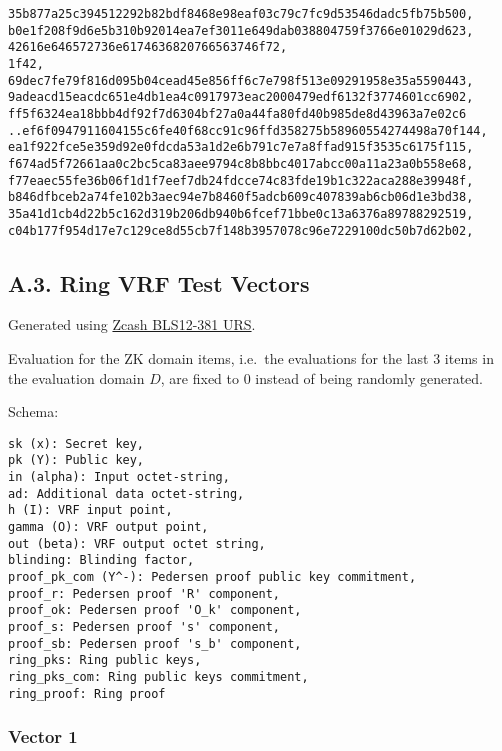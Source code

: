 \documentclass[
]{article}
\begin{document}
\begin{verbatim}
35b877a25c394512292b82bdf8468e98eaf03c79c7fc9d53546dadc5fb75b500,
b0e1f208f9d6e5b310b92014ea7ef3011e649dab038804759f3766e01029d623,
42616e646572736e6174636820766563746f72,
1f42,
69dec7fe79f816d095b04cead45e856ff6c7e798f513e09291958e35a5590443,
9adeacd15eacdc651e4db1ea4c0917973eac2000479edf6132f3774601cc6902,
ff5f6324ea18bbb4df92f7d6304bf27a0a44fa80fd40b985de8d43963a7e02c6
..ef6f0947911604155c6fe40f68cc91c96ffd358275b58960554274498a70f144,
ea1f922fce5e359d92e0fdcda53a1d2e6b791c7e7a8ffad915f3535c6175f115,
f674ad5f72661aa0c2bc5ca83aee9794c8b8bbc4017abcc00a11a23a0b558e68,
f77eaec55fe36b06f1d1f7eef7db24fdcce74c83fde19b1c322aca288e39948f,
b846dfbceb2a74fe102b3aec94e7b8460f5adcb609c407839ab6cb06d1e3bd38,
35a41d1cb4d22b5c162d319b206db940b6fcef71bbe0c13a6376a89788292519,
c04b177f954d17e7c129ce8d55cb7f148b3957078c96e7229100dc50b7d62b02,
\end{verbatim}

\hypertarget{a.3.-ring-vrf-test-vectors}{%
\subsection{A.3. Ring VRF Test
Vectors}\label{a.3.-ring-vrf-test-vectors}}

Generated using
\href{https://zfnd.org/conclusion-of-the-powers-of-tau-ceremony}{Zcash
BLS12-381 URS}.

Evaluation for the ZK domain items, i.e.~the evaluations for the last 3
items in the evaluation domain \(D\), are fixed to 0 instead of being
randomly generated.

Schema:

\begin{verbatim}
sk (x): Secret key,
pk (Y): Public key,
in (alpha): Input octet-string,
ad: Additional data octet-string,
h (I): VRF input point,
gamma (O): VRF output point,
out (beta): VRF output octet string,
blinding: Blinding factor,
proof_pk_com (Y^-): Pedersen proof public key commitment,
proof_r: Pedersen proof 'R' component,
proof_ok: Pedersen proof 'O_k' component,
proof_s: Pedersen proof 's' component,
proof_sb: Pedersen proof 's_b' component,
ring_pks: Ring public keys,
ring_pks_com: Ring public keys commitment,
ring_proof: Ring proof
\end{verbatim}

\hypertarget{vector-1-2}{%
\subsubsection{Vector 1}\label{vector-1-2}}
\end{document}
